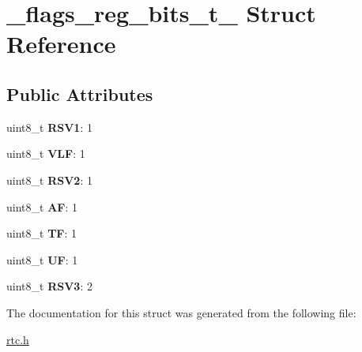 \hypertarget{struct__flags__reg__bits__t__}{}\section{\+\_\+flags\+\_\+reg\+\_\+bits\+\_\+t\+\_\+ Struct Reference}
\label{struct__flags__reg__bits__t__}
\subsection*{Public Attributes}
\begin{DoxyCompactItemize}
\item 
\mbox{\label{struct__flags__reg__bits__t___a41bed12a8c5a111795f89f6082c4bbac}} 
uint8\+\_\+t {\bfseries R\+S\+V1}\+: 1
\item 
\mbox{\label{struct__flags__reg__bits__t___a842f6ec2810689a0bc18fb5edba7ad08}} 
uint8\+\_\+t {\bfseries V\+LF}\+: 1
\item 
\mbox{\label{struct__flags__reg__bits__t___ac9d03c7b09a6a2948531b849feb2010a}} 
uint8\+\_\+t {\bfseries R\+S\+V2}\+: 1
\item 
\mbox{\label{struct__flags__reg__bits__t___a23a035887a0bb4e0d4da70be95939ec4}} 
uint8\+\_\+t {\bfseries AF}\+: 1
\item 
\mbox{\label{struct__flags__reg__bits__t___a7e2785d63db1cdd65590d1ed820b7be4}} 
uint8\+\_\+t {\bfseries TF}\+: 1
\item 
\mbox{\label{struct__flags__reg__bits__t___ae3406d492586d14725b8b7fda91e2a41}} 
uint8\+\_\+t {\bfseries UF}\+: 1
\item 
\mbox{\label{struct__flags__reg__bits__t___aaca2f18c9e9672c4171557577b8e1efa}} 
uint8\+\_\+t {\bfseries R\+S\+V3}\+: 2
\end{DoxyCompactItemize}


The documentation for this struct was generated from the following file\+:\begin{DoxyCompactItemize}
\item 
\hyperlink{rtc_8h}{rtc.\+h}\end{DoxyCompactItemize}

